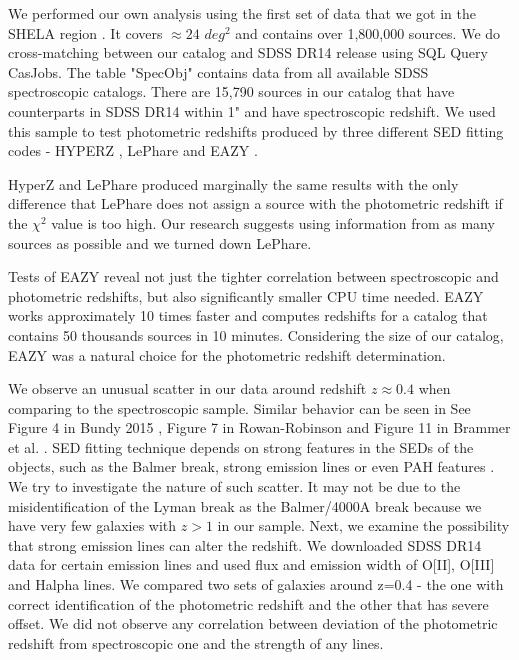 We performed our own analysis using the first set of data that we got in the SHELA region \citep{Papovich2016}. It covers $\approx24$ $deg^{2}$ and contains over 1,800,000 sources. We do cross-matching between our catalog and SDSS DR14 release using SQL Query CasJobs. The table "SpecObj" contains data from all available SDSS spectroscopic catalogs. There are 15,790 sources in our catalog that have counterparts in SDSS DR14 within 1" and have spectroscopic redshift. We used this sample to test photometric redshifts produced by three different SED fitting codes - HYPERZ \citep{Bolzonella2011}, LePhare \citep{Arnouts2011} and EAZY \citep{Brammer2008}.

HyperZ and LePhare produced marginally the same results with the only difference that LePhare does not assign a source with the photometric redshift if the $\chi^{2}$ value is too high. Our research suggests using information from as many sources as possible and we turned down LePhare.

Tests of EAZY reveal not just the tighter correlation between spectroscopic and photometric redshifts, but also significantly smaller CPU time needed. EAZY works approximately 10 times faster and computes redshifts for a catalog that contains 50 thousands sources in 10 minutes. Considering the size of our catalog, EAZY was a natural choice for the photometric redshift determination.

We observe an unusual scatter in our data around redshift $z\approx0.4$ when comparing to the spectroscopic sample. Similar behavior can be seen in See Figure 4 in Bundy 2015 \citep{Bundy2015}, Figure 7 in Rowan-Robinson \citep{Rowan-Robinson2008} and Figure 11 in Brammer et al. \citep{Brammer2008}. SED fitting technique depends on strong features in the SEDs of the objects, such as the Balmer break, strong emission lines or even PAH features \citep{2009MNRAS.394..375N}. We try to investigate the nature of such scatter. It may not be due to the misidentification of the Lyman break as the Balmer/4000A break because we have very few galaxies with $z>1$ in our sample. Next, we examine the possibility that strong emission lines can alter the redshift. We downloaded SDSS DR14 data for certain emission lines and used flux and emission width of O[II], O[III] and Halpha lines. We compared two sets of galaxies around z=0.4 - the one with correct identification of the photometric redshift and the other that has severe offset. We did not observe any correlation between deviation of the photometric redshift from spectroscopic one and the strength of any lines.

